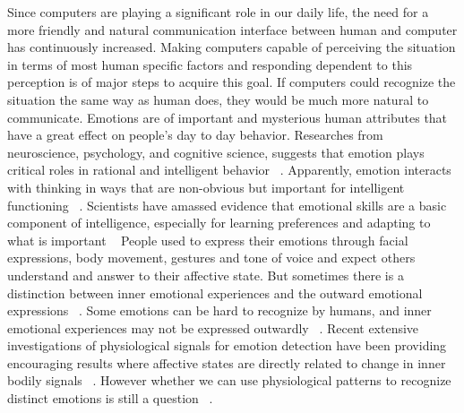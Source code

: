 \documentclass[conference]{IEEEtran}
\begin{document}
Since computers are playing a significant role in our daily life, the need for a more friendly and natural communication interface between human and computer has continuously increased. Making computers capable of perceiving the situation in terms of most human specific factors and responding dependent to this perception is of major steps to acquire this goal. If computers could recognize the situation the same way as human does, they would be much more natural to communicate. Emotions are of important and mysterious human attributes that have a great effect on people's day to day behavior. Researches from neuroscience, psychology, and cognitive science, suggests that emotion plays critical roles in rational and intelligent behavior ~\cite{picard2001toward}. Apparently, emotion interacts with thinking in ways that are non-obvious but important for intelligent functioning ~\cite{picard2001toward}. Scientists have amassed evidence that emotional skills are a basic component of intelligence, especially for learning preferences and adapting to what is important ~\cite{mayer1993intelligence, goleman2006emotional} People used to express their emotions through facial expressions, body movement, gestures and tone of voice and expect others understand and answer to their affective state. But sometimes there is a distinction between inner emotional experiences and the outward emotional expressions ~\cite{picard2003affective}. Some emotions can be hard to recognize by humans, and inner emotional experiences may not be expressed outwardly ~\cite{jones2007biometric}. Recent extensive investigations of physiological signals for emotion detection have been providing encouraging results where affective states are directly related to change in inner bodily signals ~\cite{jones2007biometric}. However whether we can use physiological patterns to recognize distinct emotions is still a question ~\cite{picard2001toward, cacioppo1990inferring}.
\end{document}
